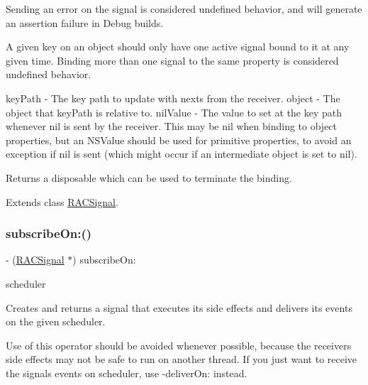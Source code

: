 Sending an error on the signal is considered undefined behavior, and will generate an assertion failure in Debug builds.

A given key on an object should only have one active signal bound to it at any given time. Binding more than one signal to the same property is considered undefined behavior.

key\+Path -\/ The key path to update with {\ttfamily next}s from the receiver. object -\/ The object that {\ttfamily key\+Path} is relative to. nil\+Value -\/ The value to set at the key path whenever {\ttfamily nil} is sent by the receiver. This may be nil when binding to object properties, but an N\+S\+Value should be used for primitive properties, to avoid an exception if {\ttfamily nil} is sent (which might occur if an intermediate object is set to {\ttfamily nil}).

Returns a disposable which can be used to terminate the binding. 

Extends class \mbox{\hyperlink{interface_r_a_c_signal_a3d59cca19be3e985aa5a08cb0386faeb}{R\+A\+C\+Signal}}.

\mbox{\label{category_r_a_c_signal_07_operations_08_a6b8db542f7106880577a943cb8e9da90}} 
\subsubsection{\texorpdfstring{subscribe\+On\+:()}{subscribeOn:()}\hspace{0.1cm}{\footnotesize\ttfamily [1/3]}}
{\footnotesize\ttfamily -\/ (\mbox{\hyperlink{interface_r_a_c_signal}{R\+A\+C\+Signal}} $\ast$) subscribe\+On\+: \begin{DoxyParamCaption}\item[{(\mbox{\hyperlink{interface_r_a_c_scheduler}{R\+A\+C\+Scheduler}} $\ast$)}]{scheduler }\end{DoxyParamCaption}}

Creates and returns a signal that executes its side effects and delivers its events on the given scheduler.

Use of this operator should be avoided whenever possible, because the receiver\textquotesingle{}s side effects may not be safe to run on another thread. If you just want to receive the signal\textquotesingle{}s events on {\ttfamily scheduler}, use -\/deliver\+On\+: instead. 

